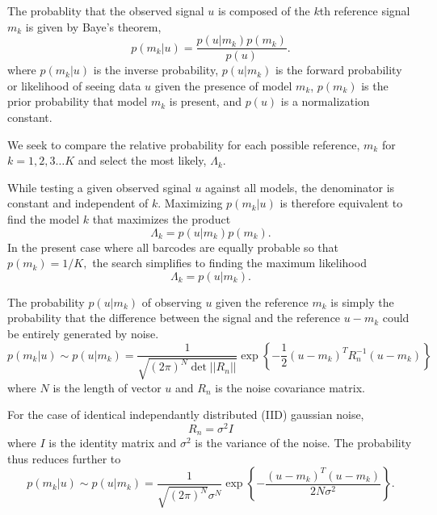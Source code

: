 The probablity that the observed signal $u$ is composed of the $k$th reference signal $m_k$ is given by Baye's theorem,
\begin{equation}\label{eq:Bayes}
p(m_k|u) = \frac{p(u|m_k)p(m_k)} {p(u)}.
\end{equation}
where $p(m_k|u)$ is the inverse probability, $p(u|m_k)$ is the forward probability or likelihood of seeing data $u$ given the presence of model $m_k$, $p(m_k)$ is the prior probability that model $m_k$ is present, and $p(u)$ is a normalization constant.

We seek to compare the relative  probability for each possible reference, $m_k$ for $k=1,2,3 \ldots K$ and select the most likely, $\Lambda_k$.  

While testing a given observed sginal $u$ against all models, the denominator is constant and independent of $k$. Maximizing $p(m_k|u)$ is therefore equivalent to find the model $k$ that maximizes the product
\begin{equation}
\Lambda_k = p(u|m_k)p(m_k).
\end{equation}
In the present case where all barcodes are equally probable so that
$p(m_k)=1/K,$ 
the search simplifies to finding the maximum likelihood 
\begin{equation}
\Lambda_k = p(u|m_k).
\end{equation}



The probability $p(u|m_k)$ of observing $u$ given the reference $m_k$  is simply the probability that the difference between the signal and the reference $u-m_k$ could be entirely generated by noise.
\begin{equation}\label{eq:Main}
p(m_k|u)\sim p(u|m_k) = \frac{1}{  \sqrt{ (2\pi)^N \det || R_n||} } \exp\left\{ -\frac{1}{2}  (u-m_k)^T R_n^{-1} (u-m_k) \right\}
\end{equation}
where $N$ is the length of vector $u$ and $R_n$ is the noise covariance matrix. 

For the case of identical independantly distributed (IID) gaussian noise, 
\begin{equation}
R_n=\sigma^2 I
\end{equation}
where $I$ is the identity matrix and $\sigma^2$ is the variance of the noise. The probability thus reduces further to
\begin{equation}\label{eq:iidEnergy}
p(m_k|u)\sim p(u|m_k) = \frac{1}{  \sqrt{ (2\pi)^N} \sigma^N  } \exp\left\{ -\frac{(u-m_k)^T(u-m_k)} {2 N \sigma^2 } \right\}.
\end{equation}

